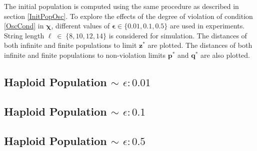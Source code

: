% 
% 
The initial population is 
computed using the same procedure as described in section \ref{InitPopOsc}. To explore the effects of the degree  
of violation of condition \ref{OscCond} in $\bm{\chi}$, different values of $\bm{\epsilon} \in \{0.01, 0.1, 0.5\} $ are used in experiments. 
String length $\ell \;\in\; \{8, 10, 12, 14\}$ is considered for simulation.
The distances of both infinite and finite populations to limit $\bm{z}^\ast$ are plotted. 
The distances of both infinite and finite populations to non-violation limits $\bm{p}^\ast$ and $\bm{q}^\ast$ are also plotted.

\subsection{Haploid Population $\mathtt{\sim}$ $\epsilon: 0.01$}

\subsection{Haploid Population $\mathtt{\sim}$ $\epsilon: 0.1$}

\subsection{Haploid Population $\mathtt{\sim}$ $\epsilon: 0.5$}


